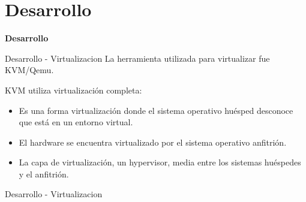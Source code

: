 \section{Desarrollo}
\begin{frame}
    \Huge
    \centering
    \textbf{ Desarrollo }

\end{frame}

\begin{frame}{Desarrollo - Virtualizacion}
    \vspace{-1.5cm}
    La herramienta utilizada para virtualizar fue KVM/Qemu.

    KVM utiliza virtualización completa:
    \begin{itemize}
        \item Es una forma virtualización donde el sistema operativo huésped desconoce que está en un entorno virtual.
        \item El hardware se encuentra virtualizado por el sistema operativo anfitrión. 
        \item La capa de virtualización, un hypervisor, media entre los sistemas huéspedes y el anfitrión. 
    \end{itemize}

\end{frame}

\begin{frame}{Desarrollo - Virtualizacion}
    \vspace{-1.5cm}
    \begin{figure}[ht]
       \centering
       \vspace{-0.50cm}
    \end{figure}

\end{frame}

